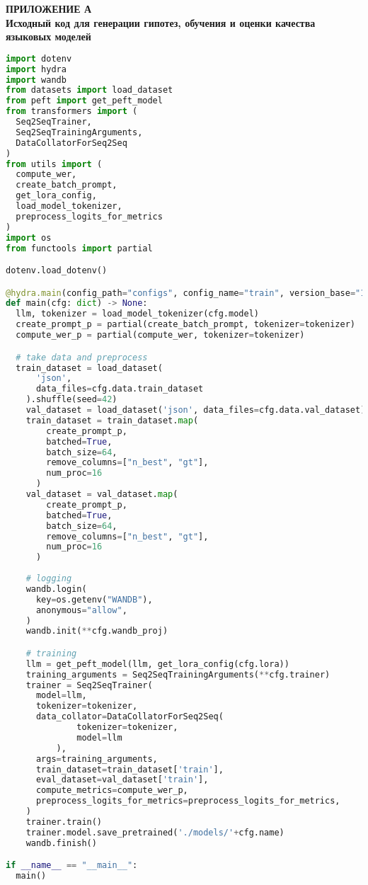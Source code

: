 \newpage
\begin{center}
  \textbf{\large ПРИЛОЖЕНИЕ А\\Исходный код для генерации гипотез, обучения и оценки качества языковых моделей}
\end{center}

\begin{lstlisting}[language=Python,label={lst:train},caption=train.py,breaklines=true,]
import dotenv
import hydra
import wandb
from datasets import load_dataset
from peft import get_peft_model
from transformers import (
  Seq2SeqTrainer,
  Seq2SeqTrainingArguments,
  DataCollatorForSeq2Seq
)
from utils import (
  compute_wer,
  create_batch_prompt,
  get_lora_config,
  load_model_tokenizer,
  preprocess_logits_for_metrics
)
import os
from functools import partial

dotenv.load_dotenv()

@hydra.main(config_path="configs", config_name="train", version_base="1.3")
def main(cfg: dict) -> None:
  llm, tokenizer = load_model_tokenizer(cfg.model)
  create_prompt_p = partial(create_batch_prompt, tokenizer=tokenizer)
  compute_wer_p = partial(compute_wer, tokenizer=tokenizer)

  # take data and preprocess
  train_dataset = load_dataset(
      'json',
      data_files=cfg.data.train_dataset
    ).shuffle(seed=42)
    val_dataset = load_dataset('json', data_files=cfg.data.val_dataset)
    train_dataset = train_dataset.map(
        create_prompt_p,
        batched=True,
        batch_size=64,
        remove_columns=["n_best", "gt"],
        num_proc=16
      )
    val_dataset = val_dataset.map(
        create_prompt_p,
        batched=True,
        batch_size=64,
        remove_columns=["n_best", "gt"],
        num_proc=16
      )
    
    # logging
    wandb.login(
      key=os.getenv("WANDB"), 
      anonymous="allow",
    )
    wandb.init(**cfg.wandb_proj)

    # training
    llm = get_peft_model(llm, get_lora_config(cfg.lora))
    training_arguments = Seq2SeqTrainingArguments(**cfg.trainer)
    trainer = Seq2SeqTrainer(
      model=llm,
      tokenizer=tokenizer,
      data_collator=DataCollatorForSeq2Seq(
              tokenizer=tokenizer,
              model=llm
          ),
      args=training_arguments,
      train_dataset=train_dataset['train'],
      eval_dataset=val_dataset['train'],
      compute_metrics=compute_wer_p,
      preprocess_logits_for_metrics=preprocess_logits_for_metrics,
    )
    trainer.train()
    trainer.model.save_pretrained('./models/'+cfg.name)
    wandb.finish()

if __name__ == "__main__":
  main()
\end{lstlisting}

